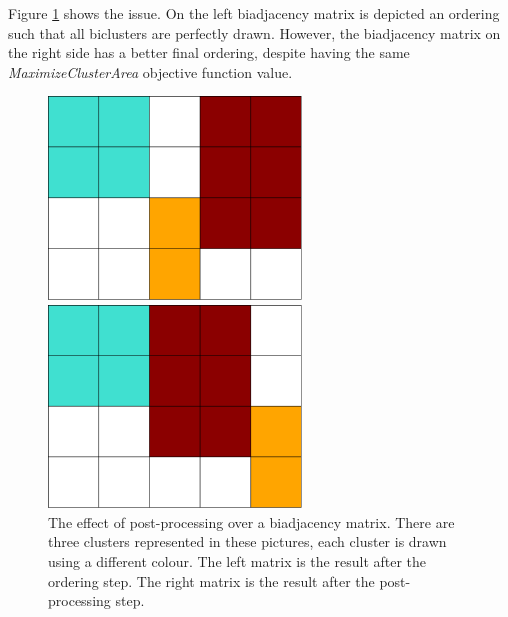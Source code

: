 \documentclass[twoside,leqno,twocolumn]{article}
\theoremstyle{definition}
\begin{document}
\medskip

\noindent Figure \ref{fig:postProcessing} shows the issue. On the left biadjacency matrix is depicted an ordering such that all biclusters are perfectly drawn. However, the biadjacency matrix on the right side has a better final ordering, despite having the same \textit{MaximizeClusterArea} objective function value.

\begin{figure}[t]
    \centering
    \begin{minipage}{0.45\textwidth}
        \centering
        \includegraphics[width=0.6\textwidth,angle=90]{figures/perfectClustering.eps} %
    \end{minipage}\hfill
    \begin{minipage}{0.45\textwidth}
        \centering
        \includegraphics[width=0.6\textwidth, angle=90]{figures/perfectSeriation.eps} %
    \end{minipage}
    \caption{The effect of post-processing over a biadjacency matrix. There are three clusters represented in these pictures, each cluster is drawn using a different colour. The left matrix is the result after the ordering step. The right matrix is the result after the post-processing step.}
    \label{fig:postProcessing}
\end{figure}
\end{document}
